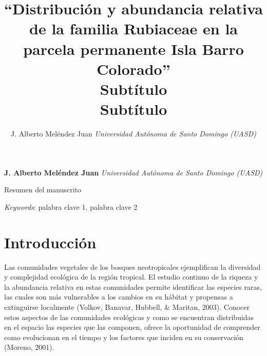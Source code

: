 \documentclass[11pt,]{article}
\title{``Distribución y abundancia relativa de la familia Rubiaceae en la
parcela permanente Isla Barro Colorado''\\
Subtítulo\\
Subtítulo  }
\author{\Large J. Alberto Meléndez Juan\vspace{0.05in} \newline\normalsize\emph{Universidad Autónoma de Santo Domingo (UASD)}  }
\date{}
\newcommand*{\authorfont}{\fontfamily{phv}\selectfont}
\renewenvironment{abstract}
 {{%
    \setlength{\leftmargin}{0mm}
    \setlength{\rightmargin}{\leftmargin}%
  }%
  \relax}
 {\endlist}
\begin{document}
	
%

{%
\setlength{\parindent}{0pt}
\thispagestyle{plain}
{\fontsize{18}{20}\selectfont\raggedright 
\maketitle  %

}

{
   \vskip 13.5pt\relax \normalsize\fontsize{11}{12} 
\textbf{\authorfont J. Alberto Meléndez Juan} \hskip 15pt \emph{\small Universidad Autónoma de Santo Domingo (UASD)}   

}

}








\begin{abstract}

    \hbox{\vrule height .2pt width 39.14pc}

    \vskip 8.5pt %

\noindent Resumen del manuscrito


\vskip 8.5pt \noindent \emph{Keywords}: palabra clave 1, palabra clave 2 \par

    \hbox{\vrule height .2pt width 39.14pc}



\end{abstract}


\vskip 6.5pt


\noindent  \section{Introducción}\label{introducciuxf3n}

Las comunidades vegetales de los bosques neotropicales ejemplifican la
diversidad y complejidad ecológica de la región tropical. El estudio
continuo de la riqueza y la abundancia relativa en estas comunidades
permite identificar las especies raras, las cuales son más vulnerables a
los cambios en su hábitat y propensas a extinguirse localmente (Volkov,
Banavar, Hubbell, \& Maritan, 2003). Conocer estos aspectos de las
comunidades ecológicas y como se encuentran distribuidas en el espacio
las especies que las componen, ofrece la oportunidad de comprender como
evolucionan en el tiempo y los factores que inciden en su conservación
(Moreno, 2001).
\end{document}
